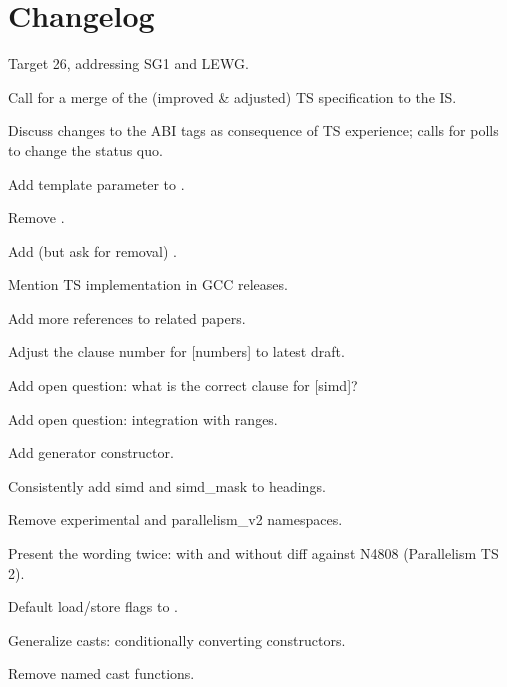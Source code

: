 \section{Changelog}
\begin{revision}
\item Target \CC{}26, addressing SG1 and LEWG.
\item Call for a merge of the (improved \& adjusted) TS specification to the IS.
\item Discuss changes to the ABI tags as consequence of TS experience; calls for polls to change the status quo.
\item Add template parameter  to .
\item Remove .
\item Add (but ask for removal) .
\item Mention TS implementation in GCC releases.
\item Add more references to related papers.
\item Adjust the clause number for [numbers] to latest draft.
\item Add open question: what is the correct clause for [simd]?
\item Add open question: integration with ranges.
\item Add  generator constructor.
\item Consistently add simd and simd_mask to headings.
\item Remove experimental and parallelism_v2 namespaces.
\item Present the wording twice: with and without diff against N4808 (Parallelism TS 2).
\item Default load/store flags to .
\item Generalize casts: conditionally  converting constructors.
\item Remove named cast functions.
\end{revision}

